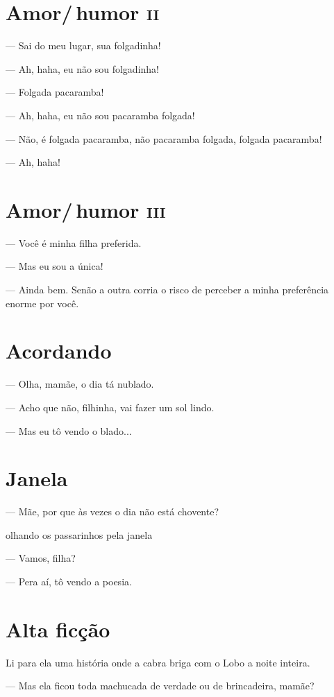 {\chapter{Amor/\,humor \textsc{ii}}

— Sai do meu lugar, sua folgadinha!

— Ah, haha, eu não sou folgadinha!

— Folgada pacaramba!

— Ah, haha, eu não sou pacaramba folgada!

— Não, é folgada pacaramba, não pacaramba folgada, folgada pacaramba!

— Ah, haha!

\chapter{Amor/\,humor \textsc{iii}}

— Você é minha filha preferida.

— Mas eu sou a única!

— Ainda bem. Senão a outra corria o risco de perceber a minha
preferência enorme por você.

\chapter{Acordando}

— Olha, mamãe, o dia tá nublado.

— Acho que não, filhinha, vai fazer um sol lindo.

— Mas eu tô vendo o blado...

\chapter{Janela}

— Mãe, por que às vezes o dia não está chovente?

olhando os passarinhos pela janela

— Vamos, filha?

— Pera aí, tô vendo a poesia.

\chapter{Alta ficção}

Li para ela uma história onde a cabra briga com o Lobo a noite inteira.

— Mas ela ficou toda machucada de verdade ou de brincadeira, mamãe?

}
